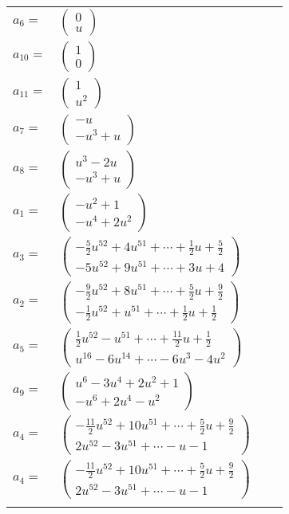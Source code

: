 \documentclass[1p]{elsarticle_modified}
\theoremstyle{definition}
\begin{document}
\begin{tabular}{m{7pt} m{180pt} m{7pt} m{180pt} }
\flushright $a_{6}=$&$\begin{pmatrix}0\\u\end{pmatrix}$ \\
\flushright $a_{10}=$&$\begin{pmatrix}1\\0\end{pmatrix}$ \\
\flushright $a_{11}=$&$\begin{pmatrix}1\\u^2\end{pmatrix}$ \\
\flushright $a_{7}=$&$\begin{pmatrix}- u\\- u^3+u\end{pmatrix}$ \\
\flushright $a_{8}=$&$\begin{pmatrix}u^3-2 u\\- u^3+u\end{pmatrix}$ \\
\flushright $a_{1}=$&$\begin{pmatrix}- u^2+1\\- u^4+2 u^2\end{pmatrix}$ \\
\flushright $a_{3}=$&$\begin{pmatrix}-\frac{5}{2} u^{52}+4 u^{51}+\cdots+\frac{1}{2} u+\frac{5}{2}\\-5 u^{52}+9 u^{51}+\cdots+3 u+4\end{pmatrix}$ \\
\flushright $a_{2}=$&$\begin{pmatrix}-\frac{9}{2} u^{52}+8 u^{51}+\cdots+\frac{5}{2} u+\frac{9}{2}\\-\frac{1}{2} u^{52}+u^{51}+\cdots+\frac{1}{2} u+\frac{1}{2}\end{pmatrix}$ \\
\flushright $a_{5}=$&$\begin{pmatrix}\frac{1}{2} u^{52}- u^{51}+\cdots+\frac{11}{2} u+\frac{1}{2}\\u^{16}-6 u^{14}+\cdots-6 u^3-4 u^2\end{pmatrix}$ \\
\flushright $a_{9}=$&$\begin{pmatrix}u^6-3 u^4+2 u^2+1\\- u^6+2 u^4- u^2\end{pmatrix}$ \\
\flushright $a_{4}=$&$\begin{pmatrix}-\frac{11}{2} u^{52}+10 u^{51}+\cdots+\frac{5}{2} u+\frac{9}{2}\\2 u^{52}-3 u^{51}+\cdots- u-1\end{pmatrix}$\\ \flushright $a_{4}=$&$\begin{pmatrix}-\frac{11}{2} u^{52}+10 u^{51}+\cdots+\frac{5}{2} u+\frac{9}{2}\\2 u^{52}-3 u^{51}+\cdots- u-1\end{pmatrix}$\\&\end{tabular}
\end{document}
